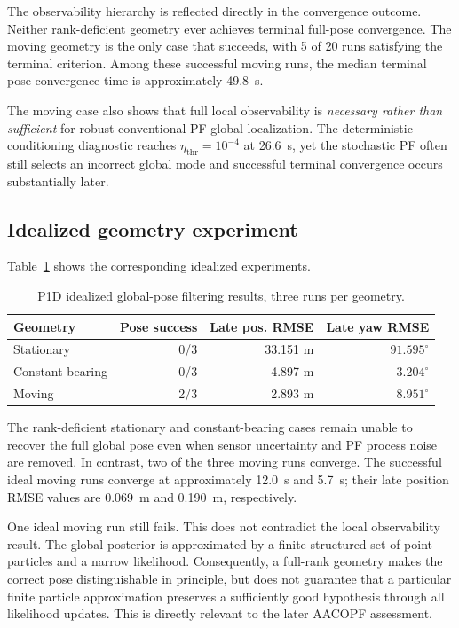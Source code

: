 The observability hierarchy is reflected directly in the convergence outcome. Neither rank-deficient geometry ever achieves terminal full-pose convergence. The moving geometry is the only case that succeeds, with 5 of 20 runs satisfying the terminal criterion. Among these successful moving runs, the median terminal pose-convergence time is approximately \SI{49.8}{s}.

The moving case also shows that full local observability is \emph{necessary rather than sufficient} for robust conventional PF global localization. The deterministic conditioning diagnostic reaches $\eta_{\mathrm{thr}}=10^{-4}$ at \SI{26.6}{s}, yet the stochastic PF often still selects an incorrect global mode and successful terminal convergence occurs substantially later.

\subsection{Idealized geometry experiment}
Table~\ref{tab:p1d_ideal} shows the corresponding idealized experiments.
\begin{table}[ht]
\centering
\caption{P1D idealized global-pose filtering results, three runs per geometry.}
\label{tab:p1d_ideal}
\begin{tabular}{lrrr}
\toprule
Geometry & Pose success & Late pos. RMSE & Late yaw RMSE\\
\midrule
Stationary & 0/3 & 33.151 m & $91.595^{\circ}$\\
Constant bearing & 0/3 & 4.897 m & $3.204^{\circ}$\\
Moving & 2/3 & 2.893 m & $8.951^{\circ}$\\
\bottomrule
\end{tabular}
\end{table}

The rank-deficient stationary and constant-bearing cases remain unable to recover the full global pose even when sensor uncertainty and PF process noise are removed. In contrast, two of the three moving runs converge. The successful ideal moving runs converge at approximately \SI{12.0}{s} and \SI{5.7}{s}; their late position RMSE values are \SI{0.069}{m} and \SI{0.190}{m}, respectively.

One ideal moving run still fails. This does not contradict the local observability result. The global posterior is approximated by a finite structured set of point particles and a narrow likelihood. Consequently, a full-rank geometry makes the correct pose distinguishable in principle, but does not guarantee that a particular finite particle approximation preserves a sufficiently good hypothesis through all likelihood updates. This is directly relevant to the later AACOPF assessment.

